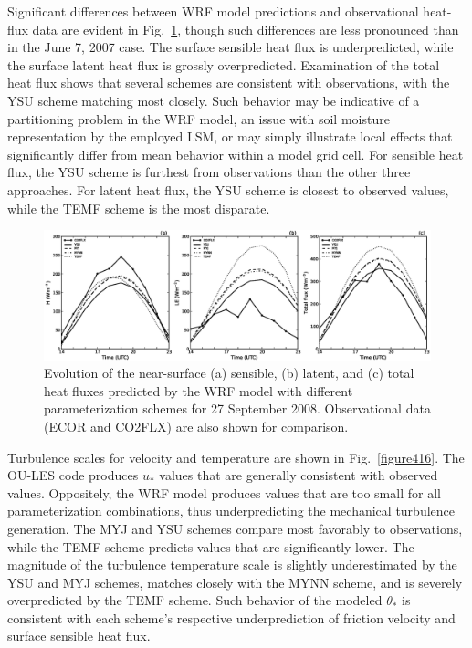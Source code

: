 Significant differences between WRF model predictions and observational heat-flux data are evident in Fig.~\ref{figure415}, though such differences are less pronounced than in the June 7, 2007 case. The surface sensible heat flux is underpredicted, while the surface latent heat flux is grossly overpredicted. Examination of the total heat flux shows that several schemes are consistent with observations, with the YSU scheme matching most closely. Such behavior may be indicative of a partitioning problem in the WRF model, an issue with soil moisture representation by the employed LSM, or may simply illustrate local effects that significantly differ from mean behavior within a model grid cell. For sensible heat flux, the YSU scheme is furthest from observations than the other three approaches. For latent heat flux, the YSU scheme is closest to observed values, while the TEMF scheme is the most disparate. 


\begin{figure}[ht!]
\begin{center}
\includegraphics[width=\textwidth]{figures/chapter4/shf_lhf_phys_20080927}
\end{center}
\caption{Evolution of the near-surface (a) sensible, (b) latent, and (c) total heat fluxes predicted by the WRF model with different parameterization schemes for 27 September 2008. Observational data (ECOR and CO2FLX) are also shown for comparison.}
\label{figure415}
\end{figure}


Turbulence scales for velocity and temperature are shown in Fig.~\ref{figure416}. The OU-LES code produces $u_*$ values that are generally consistent with observed values. Oppositely, the WRF model produces values that are too small for all parameterization combinations, thus underpredicting the mechanical turbulence generation. The MYJ and YSU schemes compare most favorably to observations, while the TEMF scheme predicts values that are significantly lower. The magnitude of the turbulence temperature scale is slightly underestimated by the YSU and MYJ schemes, matches closely with the MYNN scheme, and is severely overpredicted by the TEMF scheme. Such behavior of the modeled $\theta_*$ is consistent with each scheme's respective underprediction of friction velocity and surface sensible heat flux.


